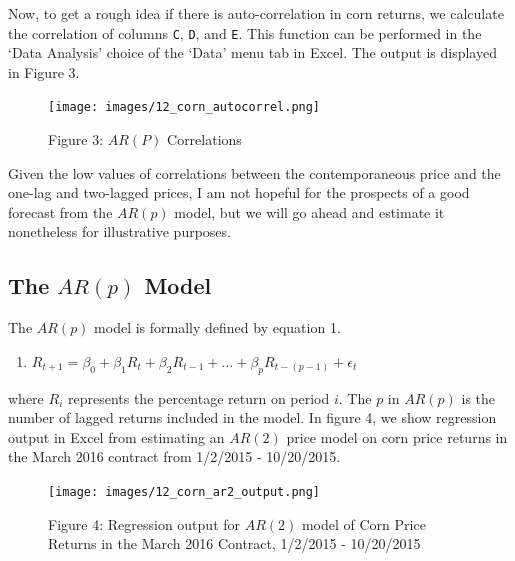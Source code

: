 \documentclass[
  letterpaper,
  DIV=11,
  numbers=noendperiod]{scrreprt}
\providecommand{\tightlist}{%
  \setlength{\itemsep}{0pt}\setlength{\parskip}{0pt}}\usepackage{longtable,booktabs,array}
\begin{document}
Now, to get a rough idea if there is auto-correlation in corn returns,
we calculate the correlation of columns \texttt{C}, \texttt{D}, and
\texttt{E}. This function can be performed in the `Data Analysis' choice
of the `Data' menu tab in Excel. The output is displayed in Figure 3.

\begin{figure}

{\centering \texttt{[image: images/12\_corn\_autocorrel.png]}

}

\caption{Figure 3: \(AR(P)\) Correlations}

\end{figure}

Given the low values of correlations between the contemporaneous price
and the one-lag and two-lagged prices, I am not hopeful for the
prospects of a good forecast from the \(AR(p)\) model, but we will go
ahead and estimate it nonetheless for illustrative purposes.

\hypertarget{the-arp-model}{%
\subsection{\texorpdfstring{The \(AR(p)\)
Model}{The AR(p) Model}}\label{the-arp-model}}

The \(AR(p)\) model is formally defined by equation 1.

\begin{enumerate}
\def\labelenumi{\arabic{enumi}.}
\tightlist
\item
  \(R_{t+1} = \beta_0 + \beta_1R_{t} + \beta_2R_{t-1}+ ... + \beta_{p}R_{t-(p-1)} + \epsilon_t\)
\end{enumerate}

where \(R_i\) represents the percentage return on period \(i\). The
\(p\) in \(AR(p)\) is the number of lagged returns included in the
model. In figure 4, we show regression output in Excel from estimating
an \(AR(2)\) price model on corn price returns in the March 2016
contract from 1/2/2015 - 10/20/2015.

\begin{figure}

{\centering \texttt{[image: images/12\_corn\_ar2\_output.png]}

}

\caption{Figure 4: Regression output for \(AR(2)\) model of Corn Price
Returns in the March 2016 Contract, 1/2/2015 - 10/20/2015}

\end{figure}
\end{document}

